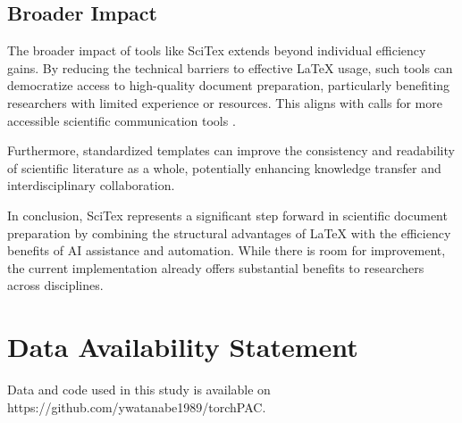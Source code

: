 \documentclass[preprint,review,12pt]{elsarticle}%
\providecommand{\DIFdelbegin}{} %
\providecommand{\DIFdelend}{} %
\newcommand{\DIFscaledelfig}{0.5}
\newlength{\DIFdelgraphicswidth} %
\newlength{\DIFdelgraphicsheight} %
\newcommand{\DIFdelincludegraphics}[2][]{%
\sbox{\DIFdelgraphicsbox}{\DIFOincludegraphics[#1]{#2}}%
\settoboxwidth{\DIFdelgraphicswidth}{\DIFdelgraphicsbox} %
\settoboxtotalheight{\DIFdelgraphicsheight}{\DIFdelgraphicsbox} %
\scalebox{\DIFscaledelfig}{%
\parbox[b]{\DIFdelgraphicswidth}{\usebox{\DIFdelgraphicsbox}\\[-\baselineskip] \rule{\DIFdelgraphicswidth}{0em}}\llap{\resizebox{\DIFdelgraphicswidth}{\DIFdelgraphicsheight}{%
\setlength{\unitlength}{\DIFdelgraphicswidth}%
\begin{picture}(1,1)%
\thicklines\linethickness{2pt} %
{\color[rgb]{1,0,0}\put(0,0){\framebox(1,1){}}}%
{\color[rgb]{1,0,0}\put(0,0){\line( 1,1){1}}}%
{\color[rgb]{1,0,0}\put(0,1){\line(1,-1){1}}}%
\end{picture}%
}\hspace*{3pt}}} %
} %
\DeclareRobustCommand{\DIFdelbegin}{\DIFOdelbegin \let\includegraphics\DIFdelincludegraphics} %
\DeclareRobustCommand{\DIFdelend}{\DIFOaddend \let\includegraphics\DIFOincludegraphics} %
\begin{document}
\begin{frontmatter}
\subsection{Broader Impact}
\label{subsec:impact}

The broader impact of tools like SciTex extends beyond individual efficiency gains. By reducing the technical barriers to effective LaTeX usage, such tools can democratize access to high-quality document preparation, particularly benefiting researchers with limited experience or resources. This aligns with calls for more accessible scientific communication tools \cite{Patel2022}.

Furthermore, standardized templates can improve the consistency and readability of scientific literature as a whole, potentially enhancing knowledge transfer and interdisciplinary collaboration.

In conclusion, SciTex represents a significant step forward in scientific document preparation by combining the structural advantages of LaTeX with the efficiency benefits of AI assistance and automation. While there is room for improvement, the current implementation already offers substantial benefits to researchers across disciplines.

\DIFdelbegin %

\DIFdelend %

\section*{Data Availability Statement}
Data and code used in this study is available on https://github.com/ywatanabe1989/torchPAC.
\label{data and code availability}







\end{frontmatter}
\end{document}
